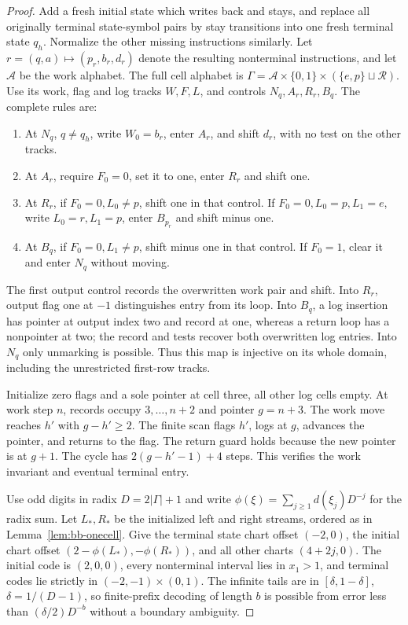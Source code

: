\begin{proof}\label{proof:bb-guarded-history}
Add a fresh initial state which writes back and stays, and replace
all originally terminal state-symbol pairs by stay transitions into
one fresh terminal state $q_h$.  Normalize the other missing
instructions similarly.  Let $r=(q,a)\mapsto(p_r,b_r,d_r)$ denote
the resulting nonterminal instructions, and let $\mathcal A$ be the
work alphabet. The full cell alphabet is
$\Gamma=\mathcal A\times\{0,1\}\times(\{e,p\}\sqcup\mathcal R)$.
Use its work, flag and log tracks $W,F,L$,
and controls $N_q,A_r,R_r,B_q$.  The complete rules are:
\begin{enumerate}
\item At $N_q$, $q\ne q_h$, write $W_0=b_r$, enter $A_r$,
and shift $d_r$, with no test on the other tracks.
\item At $A_r$, require $F_0=0$, set it to one, enter $R_r$
and shift one.
\item At $R_r$, if $F_0=0,L_0\ne p$, shift one in that control.
If $F_0=0,L_0=p,L_1=e$, write $L_0=r,L_1=p$, enter $B_{p_r}$
and shift minus one.
\item At $B_q$, if $F_0=0,L_1\ne p$, shift minus one in that
control.  If $F_0=1$, clear it and enter $N_q$ without moving.
\end{enumerate}
The first output control records the overwritten work pair and shift.
Into $R_r$, output flag one at $-1$ distinguishes entry from its
loop.  Into $B_q$, a log insertion has pointer at output index two
and record at one, whereas a return loop has a nonpointer at two;
the record and tests recover both overwritten log entries.  Into
$N_q$ only unmarking is possible.  Thus this map is injective on
its whole domain, including the unrestricted first-row tracks.

Initialize zero flags and a sole pointer at cell three, all other
log cells empty.  At work step $n$, records occupy $3,\ldots,n+2$
and pointer $g=n+3$.  The work move reaches $h'$ with $g-h'\ge2$.
The finite scan flags $h'$, logs at $g$, advances the pointer, and
returns to the flag.  The return guard holds because the new pointer
is at $g+1$.  The cycle has $2(g-h'-1)+4$ steps.  This verifies
the work invariant and eventual terminal entry.

Use odd digits in radix $D=2|\Gamma|+1$ and write
$\phi(\xi)=\sum_{j\ge1}d(\xi_j)D^{-j}$ for the radix sum.
Let $L_*,R_*$ be the initialized left and right streams, ordered as in
Lemma~\ref{lem:bb-onecell}.  Give the terminal state
chart offset $(-2,0)$, the initial chart offset
$(2-\phi(L_*),-\phi(R_*))$, and all other charts $(4+2j,0)$.
The initial code is $(2,0,0)$, every nonterminal interval lies in
$x_1>1$, and terminal codes lie strictly in $(-2,-1)\times(0,1)$.
The infinite tails are in $[\delta,1-\delta]$,
$\delta=1/(D-1)$, so finite-prefix decoding of length $b$ is possible
from error less than $(\delta/2)D^{-b}$ without a boundary ambiguity.


\end{proof}

